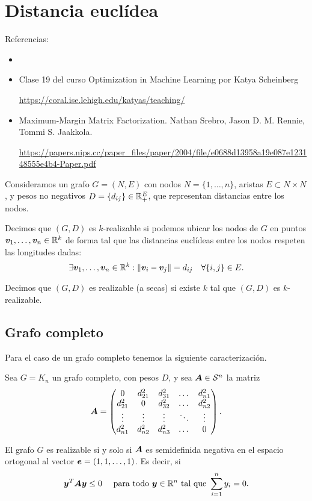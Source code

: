 \section{Distancia euclídea}

Referencias: 
\begin{itemize}
\item \cite[Secciones 2.2.5 Euclidean Distance Matrices y 2.2.6 Rank Minimization and Nuclear Norm]{Blekherman2013}

\item Clase 19 del curso Optimization in Machine Learning por Katya Scheinberg

\url{https://coral.ise.lehigh.edu/katyas/teaching/}
\item Maximum-Margin Matrix Factorization. Nathan Srebro, Jason D. M. Rennie,  Tommi S. Jaakkola.

\url{https://papers.nips.cc/paper_files/paper/2004/file/e0688d13958a19e087e123148555e4b4-Paper.pdf}
\end{itemize}

Consideramos un grafo $G = (N, E)$ con nodos $N = \{1, \dots, n\}$, aristas $E \subset N \times N$, y pesos no negativos $D = \{d_{ij}\} \in \mathbb{R}_+^E$, que representan distancias entre los nodos.

Decimos que $(G, D)$ es $k$-realizable si podemos ubicar los nodos de $G$ en puntos $\bm{v}_1, \dots, \bm{v}_n \in \mathbb{R}^k$ de forma tal que las distancias euclídeas entre los nodos respeten las longitudes dadas:
$$
\exists \bm{v}_1, \dots, \bm{v}_n \in \mathbb{R}^k:  \| \bm{v}_i - \bm{v}_j \| = d_{ij} \quad \forall \{i, j\} \in E.
$$

Decimos que $(G, D)$ es realizable (a secas) si existe $k$ tal que $(G, D)$ es $k$-realizable.

\subsection{Grafo completo}

Para el caso de un grafo completo tenemos la siguiente caracterización.

\begin{theorem}
Sea $G = K_n$ un grafo completo, con pesos $D$, y sea $\bm{A} \in {\mathcal S}^{n}$ la matriz
{\small
$$
\bm{A} = \begin{pmatrix}
0 & d_{21}^2 & d_{31}^2 & \dots & d_{n1}^2 \\
d_{21}^2 & 0 & d_{32}^2 & \dots & d_{n2}^2 \\
\vdots & \vdots & \vdots & \ddots & \vdots \\
d_{n1}^2 & d_{n2}^2 & d_{n3}^2 & \dots & 0
\end{pmatrix}.
$$}
\vspace{-0.5cm}

El grafo $G$ es realizable si y solo si $\bm{A}$ es semidefinida negativa en el espacio ortogonal al vector $\bm{e} = (1, 1, \dots, 1)$. Es decir, si
$$
\bm{y}^T \bm{A} \bm{y} \le 0 \quad \text{ para todo } \bm{y} \in \mathbb{R}^n \text{ tal que } \sum_{i=1}^n y_i = 0.
$$
\end{theorem}

